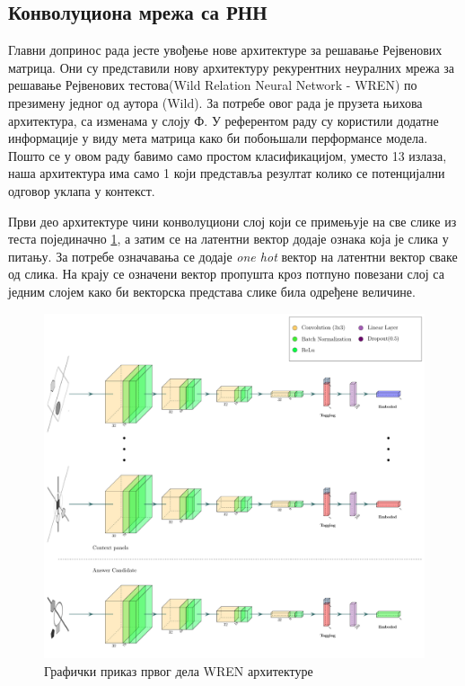 \documentclass[a4paper, 12pt, master, utf8]{etf}
\begin{document}
\subsection{Конволуциона мрежа са РНН}
Главни допринос рада \cite{barrett_measuring_2018} јесте увођење нове архитектуре за решавање Рејвенових матрица. Они су представили 
нову архитектуру рекурентних неуралних мрежа за решавање Рејвенових тестова(Wild Relation Neural Network - WREN) по презимену једног од аутора (Wild).
За потребе овог рада је прузета њихова архитектура, са изменама у слоју Ф. У референтом раду су користили додатне информације у виду мета матрица како би побоњшали перформансе модела. 
Пошто се у овом раду бавимо само простом класификацијом, уместо 13 излаза, наша архитектура има само 1 који представља резултат колико се потенцијални одговор уклапа у контекст.
\newline

Први део архитектуре чини конволуциони слој који се примењује на све слике из теста појединачно \ref{fig:wren1}, а затим се на латентни вектор додаје ознака која је слика у питању. 
За потребе означавања се додаје \textit{one hot} вектор на латентни вектор сваке од слика. На крају се означени вектор пропушта кроз потпуно повезани слој са једним слојем како би векторска представа слике била одређене величине.
\newline

\begin{figure}[H]
    \centering
    \includegraphics[width=\textwidth]{arhitekture/wren1.pdf}
    \caption{Графички приказ првог дела WREN архитектуре}
    \label{fig:wren1}
\end{figure}
\end{document}
